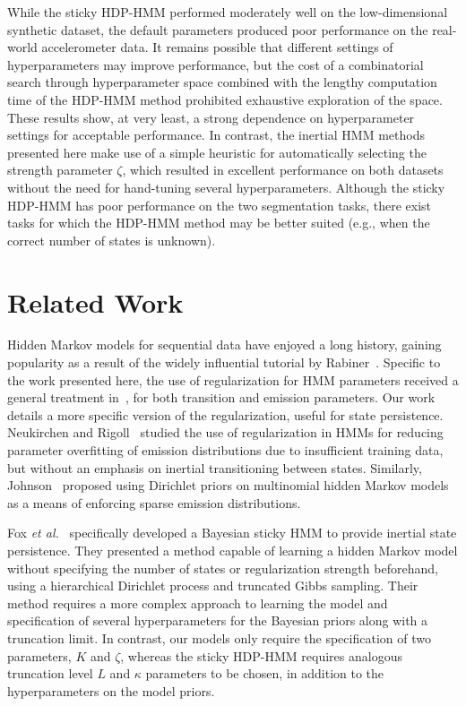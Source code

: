 \documentclass[letterpaper]{article}
\begin{document}
While the sticky HDP-HMM performed moderately well on the low-dimensional
synthetic dataset, the default parameters produced poor performance on the
real-world accelerometer data. It remains possible that different settings of
hyperparameters may improve performance, but the cost of a combinatorial search
through hyperparameter space combined with the lengthy computation time of the
HDP-HMM method prohibited exhaustive exploration of the space. These results
show, at very least, a strong dependence on hyperparameter settings for
acceptable performance. In contrast, the inertial HMM methods presented here
make use of a simple heuristic for automatically selecting the strength
parameter $\zeta$, which resulted in excellent performance on both datasets
without the need for hand-tuning several hyperparameters. Although the sticky HDP-HMM 
has poor performance on the two segmentation tasks, there exist tasks for which the 
HDP-HMM method may be better suited (e.g., when the correct number of states is unknown).
\vspace{-0.2cm}
\section{Related Work}
\vspace{-0.1cm}
Hidden Markov models for sequential data have enjoyed a long history, gaining
popularity as a result of the widely influential tutorial by
Rabiner~\cite{rabiner1989tutorial}. Specific to the work presented here, the use
of regularization for HMM parameters received a general treatment
in~\cite{MAP1994}, for both transition and emission parameters. Our work details
a more specific version of the regularization, useful for state persistence.
Neukirchen and Rigoll~\cite{neukirchen1999controlling} studied the use of
regularization in HMMs for reducing parameter overfitting of emission
distributions due to insufficient training data, but without an emphasis on
inertial transitioning between states. Similarly,
Johnson~\cite{Johnson07whydoesnt} proposed using Dirichlet priors on multinomial
hidden Markov models as a means of enforcing sparse emission distributions.

Fox \emph{et al.}\ \cite{fox2011sticky} specifically developed a Bayesian sticky
HMM to provide inertial state persistence. They presented a method capable of
learning a hidden Markov model without specifying the number of states or
regularization strength beforehand, using a hierarchical Dirichlet process and
truncated Gibbs sampling. Their method requires a more complex approach to
learning the model and specification of several hyperparameters for the Bayesian priors 
along with a truncation limit. In contrast, our models only require the 
specification of two parameters, $K$ and $\zeta$, whereas the
sticky HDP-HMM requires analogous truncation level $L$ and $\kappa$ parameters
to be chosen, in addition to the hyperparameters on the model priors. 
\vspace{-0.2cm}
\end{document}
